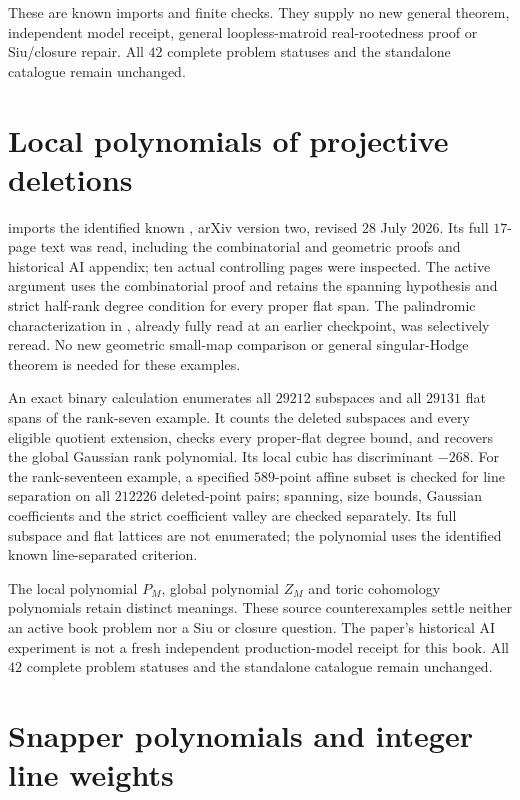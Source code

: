 These are known imports and finite checks. They supply no new
general theorem, independent model receipt, general loopless-matroid
real-rootedness proof or Siu/closure repair. All $42$ complete
problem statuses and the standalone catalogue remain unchanged.

\section{Local polynomials of projective deletions}
\label{sec:provenance-projective-deletion-KL}

 imports the identified
known \cite[Theorem~1.1, Proposition~2.6, Corollaries~1.2--1.3
and Appendix, Theorem~A.4]{ChengLiu26MatroidKL}, arXiv version
two, revised 28 July 2026. Its full $17$-page text was read,
including the combinatorial and geometric proofs and historical
AI appendix; ten actual controlling pages were inspected.
The active argument uses the combinatorial proof and retains
the spanning hypothesis and strict half-rank degree condition
for every proper flat span. The palindromic characterization
in \cite[\S1.1]{BHM26SingularHodge}, already fully read at an
earlier checkpoint, was selectively reread. No new geometric
small-map comparison or general singular-Hodge theorem is
needed for these examples.

An exact binary calculation enumerates all $29212$ subspaces
and all $29131$ flat spans of the rank-seven example. It counts
the deleted subspaces and every eligible quotient extension,
checks every proper-flat degree bound, and recovers the global
Gaussian rank polynomial. Its local cubic has discriminant
$-268$. For the rank-seventeen example, a specified $589$-point
affine subset is checked for line separation on all $212226$
deleted-point pairs; spanning, size bounds, Gaussian coefficients
and the strict coefficient valley are checked separately.
Its full subspace and flat lattices are not enumerated; the
polynomial uses the identified known line-separated criterion.

The local polynomial $P_M$, global polynomial $Z_M$ and toric
cohomology polynomials retain distinct meanings. These source
counterexamples settle neither an active book problem nor a
Siu or closure question. The paper's historical AI experiment
is not a fresh independent production-model receipt for this
book. All $42$ complete problem statuses and the standalone
catalogue remain unchanged.

\section{Snapper polynomials and integer line weights}
\label{sec:provenance-matroid-Snapper}

